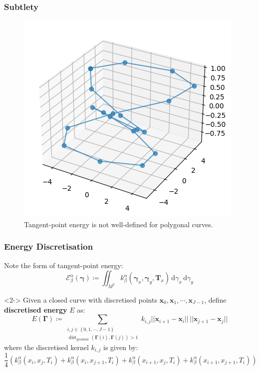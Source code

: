 \documentclass{beamer}
\theoremstyle{remark}
\newcommand{\gammabf}{\boldsymbol{\gamma}}
\newcommand{\Gammabf}{\boldsymbol{\Gamma}}
\newcommand{\xbf}{\mathbf{x}}
\newcommand{\intd}{\, \text{d}}
\newcommand{\norm}[1]{\lvert \lvert #1 \rvert \rvert}
\DeclareMathOperator{\dist}{dist}
\begin{document}
\begin{frame}
    \frametitle{Subtlety}
    \begin{figure}[h]
        \centering
        \includegraphics[scale=0.5]{discretization-only}
        \caption{Tangent-point energy is not well-defined for polygonal curves.}
    \end{figure}
\end{frame}

\begin{frame}
    \frametitle{Energy Discretisation}
    Note the form of tangent-point energy:
        \begin{equation}
            \mathcal{E}_{\beta}^{\alpha} \left( \gammabf \right) \coloneqq \iint_{M^2} k_{\beta}^{\alpha} \left( \gammabf_x, \gammabf_y, \mathbf{T}_x \right) \intd \gamma_x \intd \gamma_y
        \end{equation}

    \begin{definition}<2->
        Given a closed curve with discretised points $\xbf_0, \xbf_1, \cdots, \xbf_{J-1}$,
        define \textbf{discretised energy} $E$ as:
        \begin{equation*}
            E \left( \Gammabf \right) \coloneqq \sum_{\substack{i, j \in \left\{ 0, 1, \cdots, J-1 \right\} \\ \dist_{\text{geodesic}} \left( \Gammabf(i), \Gammabf(j) \right) > 1}} 
            k_{i,j}
            \norm{\xbf_{i+1} - \xbf_{i}} \, \norm{\xbf_{j+1} - \xbf_{j}}
        \end{equation*}
        where the discretised kernel $k_{i,j}$ is given by:
        \begin{equation*}
            \frac{1}{4} \left( 
                k_{\beta}^{\alpha} \left( x_i, x_j, T_i \right)
                + k_{\beta}^{\alpha} \left( x_i, x_{j+1}, T_i \right)
                + k_{\beta}^{\alpha} \left( x_{i+1}, x_j, T_i \right)
            + k_{\beta}^{\alpha} \left( x_{i+1}, x_{j+1}, T_i \right) \right)
        \end{equation*}
    \end{definition}
\end{frame}
\end{document}
